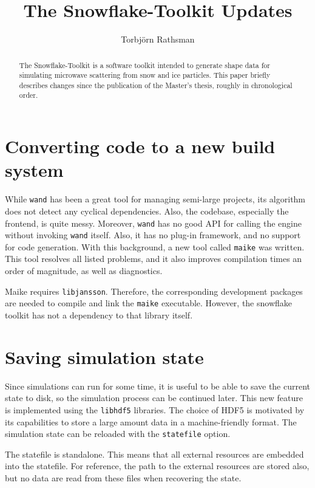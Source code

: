 \documentclass[a4paper,10pt]{scrartcl}
\title{The Snowflake-Toolkit Updates}
\author{Torbjörn Rathsman}
\newcommand{\prgname}[1]{\texttt{#1}}
\begin{document}
\maketitle
\begin{abstract}
The Snowflake-Toolkit is a software toolkit intended to generate shape data for simulating microwave scattering from snow and ice particles. This paper briefly describes changes since the publication of the Master's thesis, roughly in chronological order. 
\end{abstract}



\tableofcontents

\section{Converting code to a new build system}
While \prgname{wand} has been a great tool for managing semi-large projects, its algorithm does not detect any cyclical dependencies. Also, the codebase, especially the frontend, is quite messy. Moreover, \prgname{wand} has no good API for calling the engine without invoking \prgname{wand} itself. Also, it has no plug-in framework, and no support for code generation. With this background, a new tool called \prgname{maike}\cite{maike} was written. This tool resolves all listed problems, and it also improves compilation times an order of magnitude, as well as diagnostics.

Maike requires \prgname{libjansson}. Therefore, the corresponding development packages are needed to compile and link the \prgname{maike} executable. However, the snowflake toolkit has not a dependency to that library itself.

\section{Saving simulation state}
Since simulations can run for some time, it is useful to be able to save the current state to disk, so the simulation process can be continued later. This new feature is implemented using the \prgname{libhdf5} libraries. The choice of HDF5 is motivated by its capabilities to store a large amount data in a machine-friendly format. The simulation state can be reloaded with the \texttt{statefile} option.

The statefile is standalone. This means that all external resources are embedded into the statefile. For reference, the path to the external resources are stored also, but no data are read from these files when recovering the state.
\end{document}
